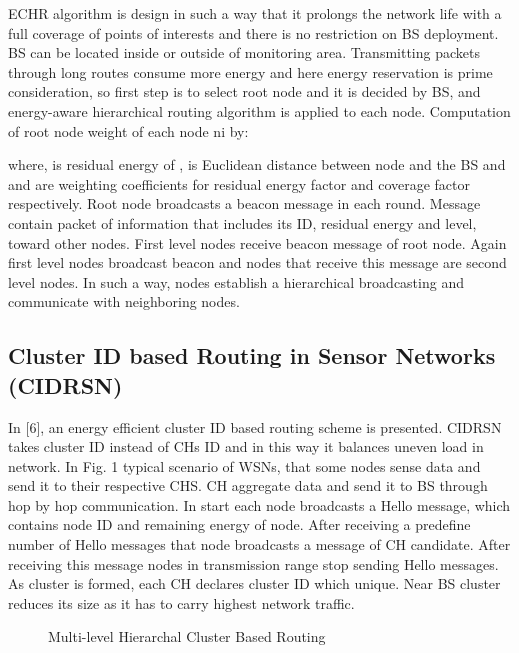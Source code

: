 \documentclass[10pt, conference, compsocconf]{IEEEtran}
\begin{document}
ECHR algorithm is design in such a way that it prolongs the network life with a full coverage of points of interests and there is no restriction on BS deployment. BS can be located inside or outside of monitoring area. Transmitting packets through long routes consume more energy and here energy reservation is prime consideration, so first step is to select root node and it is decided by BS, and energy-aware hierarchical routing algorithm is applied to each node. Computation of root node weight of each node ni by:



where,  is residual energy of ,  is Euclidean distance  between node  and the BS and  and  are weighting coefficients for residual energy factor and coverage factor respectively.
Root node broadcasts a beacon message in each round. Message contain packet of information that includes its ID, residual energy and level, toward other nodes. First level nodes receive beacon message of root node. Again first level nodes broadcast beacon and nodes that receive this message are second level nodes. In such a way, nodes establish a hierarchical broadcasting and communicate with neighboring nodes.

\subsection{ Cluster ID based Routing in Sensor Networks (CIDRSN)}
In [6], an energy efficient cluster ID based routing scheme is presented. CIDRSN takes cluster ID instead of CHs ID and in this way it balances uneven load in network. In Fig. 1 typical scenario of WSNs, that some nodes sense data and send it to their respective CHS. CH aggregate data and send it to BS through hop by hop communication. In start each node broadcasts a Hello message, which contains node ID and remaining energy of  node. After receiving a predefine number of Hello messages that node broadcasts a message of CH candidate. After receiving this message nodes in  transmission range stop sending Hello messages. As cluster is formed, each CH declares cluster ID which unique. Near BS cluster reduces its size as it has to carry highest network traffic.

\begin{figure*}[!ht]
  \centering
  \caption{Multi-level Hierarchal Cluster Based Routing}\label{Fig. 1}
\end{figure*}
\end{document}
